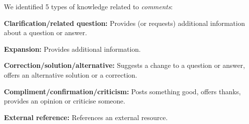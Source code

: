 \documentclass{sig-alternate-05-2015}
\begin{document}


	We identified 5 types of knowledge related to \textit{comments}:
	\begin{packed_enum}
		\item \textbf{Clarification/related question:} Provides (or requests) additional information about a question or answer.
		\item \textbf{Expansion:} Provides additional information.
		\item \textbf{Correction/solution/alternative:} Suggests a change to a question or answer, offers an alternative solution or a correction.
		\item \textbf{Compliment/confirmation/criticism:} Posts something good, offers thanks, provides an opinion or criticise someone.
		\item \textbf{External reference:} References an external resource.
	\end{packed_enum}


\end{document}
